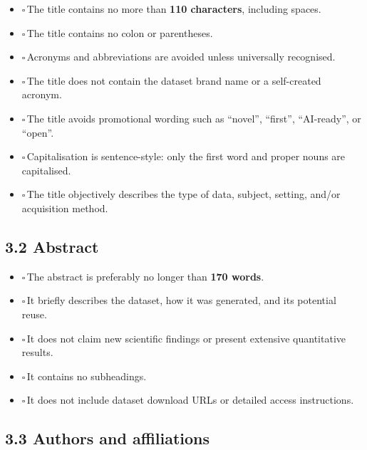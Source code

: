 \documentclass[11pt]{article}
\newcommand{\cbox}{$\square$\,}
\begin{document}
\begin{itemize}
    \item \cbox The title contains no more than \textbf{110 characters}, including spaces.
    \item \cbox The title contains no colon or parentheses.
    \item \cbox Acronyms and abbreviations are avoided unless universally recognised.
    \item \cbox The title does not contain the dataset brand name or a self-created acronym.
    \item \cbox The title avoids promotional wording such as ``novel'', ``first'', ``AI-ready'', or ``open''.
    \item \cbox Capitalisation is sentence-style: only the first word and proper nouns are capitalised.
    \item \cbox The title objectively describes the type of data, subject, setting, and/or acquisition method.
\end{itemize}

\subsection*{3.2 Abstract}

\begin{itemize}
    \item \cbox The abstract is preferably no longer than \textbf{170 words}.
    \item \cbox It briefly describes the dataset, how it was generated, and its potential reuse.
    \item \cbox It does not claim new scientific findings or present extensive quantitative results.
    \item \cbox It contains no subheadings.
    \item \cbox It does not include dataset download URLs or detailed access instructions.
\end{itemize}

\subsection*{3.3 Authors and affiliations}
\end{document}
